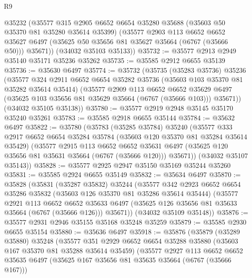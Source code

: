 \begin{lexlean}{R9}
\begin{coremodule}
      @35232
      (@35577
        @315
        @2905
        @6652
        @6654
        @35280
        @35688
        (@35603 @50 @35370 @81 @35280 @35614 @35399)
        (@35577
          @2903
          @113
          @6652
          @6652
          @35627
          @6497
          (@35625 @50 @35656 @81 @35627 @35664 (@6767 (@35666 @50)))
          @35671))
      (@34032 @35103 @35133))
@35732 := @35577 @2913 @2949 @35140 @35171 @35236 @35262
@35735 := @35585 @2912 @6655 @35139
@35736 := @35630 @6497
@35774 := @35732
    (@35735
      (@35283 @35736)
      @35236
      (@35577
        @324
        @2911
        @6652
        @6654
        @35282
        @35736
        (@35603 @103 @35370 @81 @35282 @35614 @35414)
        (@35577
          @2909
          @113
          @6652
          @6652
          @35629
          @6497
          (@35625 @103 @35656 @81 @35629 @35664 (@6767 (@35666 @103)))
          @35671))
      (@34032 @35105 @35138))
@35780 := @35577 @2919 @2948 @35145 @35170 @35240 @35261
@35783 := @35585 @2918 @6655 @35144
@35784 := @35632 @6497
@35822 := @35780
    (@35783
      (@35285 @35784)
      @35240
      (@35577
        @333
        @2917
        @6652
        @6654
        @35284
        @35784
        (@35603 @120 @35370 @81 @35284 @35614 @35429)
        (@35577
          @2915
          @113
          @6652
          @6652
          @35631
          @6497
          (@35625 @120 @35656 @81 @35631 @35664 (@6767 (@35666 @120)))
          @35671))
      (@34032 @35107 @35143))
@35828 := @35577 @2925 @2947 @35150 @35169 @35244 @35260
@35831 := @35585 @2924 @6655 @35149
@35832 := @35634 @6497
@35870 := @35828
    (@35831
      (@35287 @35832)
      @35244
      (@35577
        @342
        @2923
        @6652
        @6654
        @35286
        @35832
        (@35603 @126 @35370 @81 @35286 @35614 @35444)
        (@35577
          @2921
          @113
          @6652
          @6652
          @35633
          @6497
          (@35625 @126 @35656 @81 @35633 @35664 (@6767 (@35666 @126)))
          @35671))
      (@34032 @35109 @35148))
@35876 := @35577 @2931 @2946 @35155 @35168 @35248 @35259
@35879 := @35585 @2930 @6655 @35154
@35880 := @35636 @6497
@35918 := @35876
    (@35879
      (@35289 @35880)
      @35248
      (@35577
        @351
        @2929
        @6652
        @6654
        @35288
        @35880
        (@35603 @167 @35370 @81 @35288 @35614 @35459)
        (@35577
          @2927
          @113
          @6652
          @6652
          @35635
          @6497
          (@35625 @167 @35656 @81 @35635 @35664 (@6767 (@35666 @167)))

\end{coremodule}
\end{lexlean}
